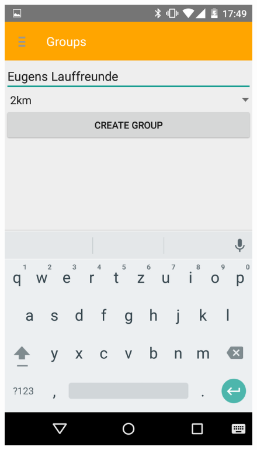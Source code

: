 \begin{figure}
\centering
\begin{minipage}{.4\textwidth}
  \centering
  \includegraphics[width=.8\linewidth]{abb/bsp/bsp3}
  \label{fig:bsp3}
\end{minipage}%
\begin{minipage}{.4\textwidth}
  \centering

\end{minipage}
\end{figure}
